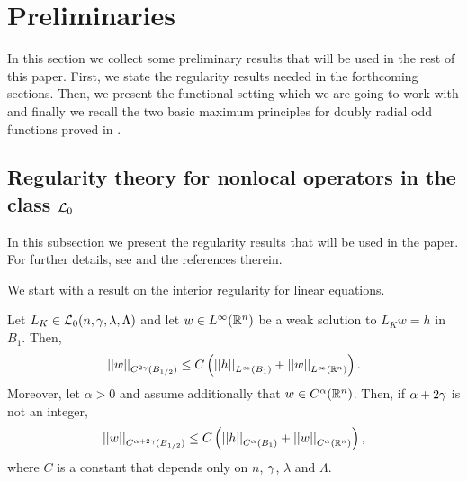 \section{Preliminaries}
\label{Sec:Preliminaries}

In this section we collect some preliminary results that will be used in the rest of this paper. First, we state the regularity results needed in the forthcoming sections. Then, we present the functional setting which we are going to work with and finally we recall the two basic maximum principles for doubly radial odd functions proved in \cite{FelipeSanz-Perela:IntegroDifferentialI}.


\subsection{Regularity theory for nonlocal operators in the class $\mathcal{L}_0$}
\label{Subsec:Regularity}


In this subsection we present the regularity results that will be used in the paper. For further details, see \cite{RosOton-Survey,SerraC2s+alphaRegularity} and the references therein. 


We start with a result on the interior regularity for linear equations.

\begin{proposition}
	\label{Prop:InteriorRegularity}
	Let $L_K \in\mathcal{L}_0(n,\gamma,\lambda, \Lambda)$ and let $w\in L^\infty (\mathbb{R}^n)$ be a weak solution to $L_K w = h$ in $B_1$. Then,
	\begin{equation}
	\label{Eq:C2sEstimate}
	\left | \left |{w} \right | \right |_{C^{2\gamma} (B_{1/2})} \leq C\left ( {\left | \left |{h} \right | \right |_{L^\infty (B_1)} + \left | \left |{w} \right | \right |_{L^\infty  (\mathbb{R}^n)} }\right ).
	\end{equation}
	Moreover, let $\alpha > 0$ and assume additionally that $w \in C^\alpha (\mathbb{R}^n)$. Then, if $\alpha +
	2\gamma$ is not an integer,
	\begin{equation}
	\label{Eq:Calpha->Calpha+2sEstimate}
	\left | \left |{w} \right | \right |_{C^{\alpha + 2\gamma} (B_{1/2})} \leq C\left ( {\left | \left |{h} \right | \right |_{C^{\alpha} (B_1)} + \left | \left |{w} \right | \right |_{C^\alpha (\mathbb{R}^n)} }\right ),
	\end{equation}
	where $C$ is a constant that depends only on $n$, $\gamma$, $\lambda$ and $\Lambda$.
\end{proposition}


